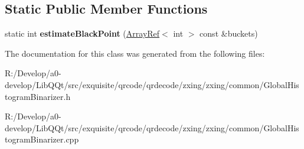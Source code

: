 \subsection*{Static Public Member Functions}
\begin{DoxyCompactItemize}
\item 
\mbox{\label{classzxing_1_1_global_histogram_binarizer_a733c34762704e48510ece164b50730ce}} 
static int {\bfseries estimate\+Black\+Point} (\mbox{\hyperlink{classzxing_1_1_array_ref}{Array\+Ref}}$<$ int $>$ const \&buckets)
\end{DoxyCompactItemize}


The documentation for this class was generated from the following files\+:\begin{DoxyCompactItemize}
\item 
R\+:/\+Develop/a0-\/develop/\+Lib\+Q\+Qt/src/exquisite/qrcode/qrdecode/zxing/zxing/common/Global\+Histogram\+Binarizer.\+h\item 
R\+:/\+Develop/a0-\/develop/\+Lib\+Q\+Qt/src/exquisite/qrcode/qrdecode/zxing/zxing/common/Global\+Histogram\+Binarizer.\+cpp\end{DoxyCompactItemize}
